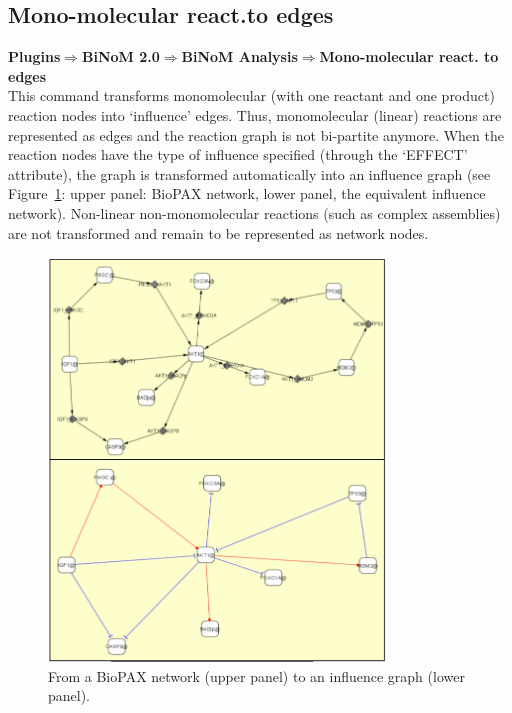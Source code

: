\subsection{Mono-molecular react.to edges}
\textbf{Plugins$\Rightarrow$BiNoM 2.0$\Rightarrow$BiNoM Analysis$\Rightarrow$Mono-molecular react. to edges}\\
This command transforms monomolecular (with one reactant and one product) reaction nodes into ‘influence’ edges. Thus, monomolecular (linear) reactions are represented as edges and the reaction graph is not bi-partite anymore. When the reaction nodes have the type of influence specified (through the ‘EFFECT’ attribute), the graph is transformed automatically into an influence graph (see Figure~\ref{Network_to_influence_graph}: upper panel: BioPAX network, lower panel, the equivalent influence network). Non-linear non-monomolecular reactions (such as complex assemblies) are not transformed and remain to be represented as network nodes.
\begin{figure}
\centering
\includegraphics[width=0.8\textwidth]{graphics/Network_to_influence_graph}
\caption{From a BioPAX network (upper panel) to an influence graph (lower panel).}
\label{Network_to_influence_graph}
\end{figure}

